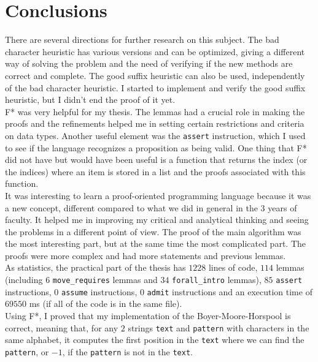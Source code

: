 \chapter*{Conclusions} 

There are several directions for further research on this subject. The bad character heuristic has various versions and can be optimized, giving a different way of solving the problem and the need of verifying if the new methods are correct and complete. The good suffix heuristic can also be used, independently of the bad character heuristic. I started to implement and verify the good suffix heuristic, but I didn't end the proof of it yet.\\
\indent F* was very helpful for my thesis. The lemmas had a crucial role in making the proofs and the refinements helped me in setting certain restrictions and criteria on data types. Another useful element was the \texttt{assert} instruction, which I used to see if the language recognizes a proposition as being valid. One thing that F* did not have but would have been useful is a function that returns the index (or the indices) where an item is stored in a list and the proofs associated with this function. \\
\indent It was interesting to learn a proof-oriented programming language because it was a new concept, different compared to what we did in general in the \(3\) years of faculty. It helped me in improving my critical and analytical thinking and seeing the problems in a different point of view. The proof of the main algorithm was the most interesting part, but at the same time the most complicated part. The proofs were more complex and had more statements and previous lemmas.\\
\indent As statistics, the practical part of the thesis has \(1228\) lines of code, \(114\) lemmas (including \(6\) \texttt{move\_requires} lemmas and \(34\) \texttt{forall\_intro} lemmas), \(85\) \texttt{assert} instructions, \(0\) \texttt{assume} instructions, \(0\) \texttt{admit} instructions and
an execution time of \(69550\) ms (if all of the code is in the same file). \\
\indent Using F*, I proved that my implementation of the Boyer-Moore-Horspool is correct, meaning that, for any \(2\) strings \texttt{text} and \texttt{pattern} with characters in the same alphabet, it computes the first position in the \texttt{text} where we can find the \texttt{pattern}, or \(-1\), if the \texttt{pattern} is not in the \texttt{text}.